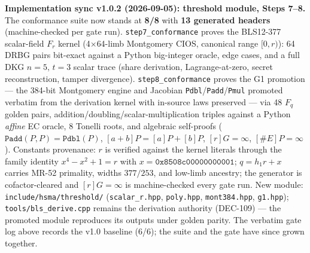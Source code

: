 \documentclass[11pt, a4paper]{article}
\begin{document}
\textbf{Implementation sync v1.0.2 (2026-09-05): threshold module, Steps 7--8.}
The conformance suite now stands at \textbf{8/8} with \textbf{13 generated headers}
(machine-checked per gate run). \texttt{step7\_conformance} proves the BLS12-377
scalar-field $F_r$ kernel (4$\times$64-limb Montgomery CIOS, canonical range
 $[0,r)$): 64 DRBG pairs bit-exact against a Python big-integer oracle, edge cases,
and a full DKG $n{=}5,\,t{=}3$ scalar trace (share derivation, Lagrange-at-zero,
secret reconstruction, tamper divergence). \texttt{step8\_conformance} proves the
G1 promotion --- the 384-bit Montgomery engine and Jacobian
\texttt{Pdbl}/\texttt{Padd}/\texttt{Pmul} promoted verbatim from the derivation
kernel with in-source laws preserved --- via 48 $F_q$ golden pairs,
addition/doubling/scalar-multiplication triples against a Python \emph{affine} EC
oracle, 8 Tonelli roots, and algebraic self-proofs
($\mathtt{Padd}(P,P)=\mathtt{Pdbl}(P)$, $[a{+}b]P=[a]P+[b]P$, $[r]G=\infty$,
 $[\#E]P=\infty$). Constants provenance: $r$ is verified against the kernel literals
through the family identity $x^4 - x^2 + 1 = r$ with
 $x=\texttt{0x8508c00000000001}$; $q = h_1 r + x$ carries MR-52 primality, widths
 $377/253$, and low-limb ancestry; the generator is cofactor-cleared and
 $[r]G=\infty$ is machine-checked every gate run. New module:
\texttt{include/hsma/threshold/} (\texttt{scalar\_r.hpp}, \texttt{poly.hpp},
\texttt{mont384.hpp}, \texttt{g1.hpp}); \texttt{tools/bls\_derive.cpp} remains the
derivation authority (DEC-109) --- the promoted module reproduces its outputs
under golden parity. The verbatim gate log above records the v1.0 baseline
(6/6); the suite and the gate have since grown together.
\end{document}
